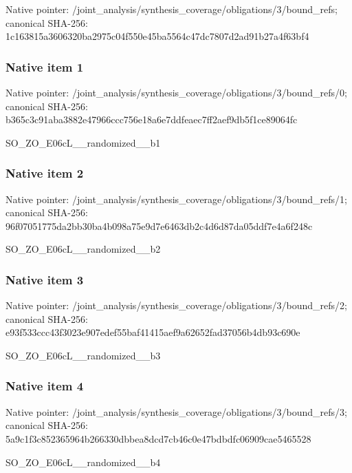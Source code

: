 \documentclass[10pt,a4paper]{article}
\begin{document}
Native pointer: /joint\_analysis/synthesi\allowbreak{}s\_coverage/obligations/3\allowbreak{}/bound\_refs; canonical SHA-256: 1c163815a3606320ba2975c0\allowbreak{}4f550e45ba5564c47dc7807d\allowbreak{}2ad91b27a4f63bf4



\subsubsection{Native item 1}


Native pointer: /joint\_analysis/synthesi\allowbreak{}s\_coverage/obligations/3\allowbreak{}/bound\_refs/0; canonical SHA-256: b365c3c91aba3882e47966cc\allowbreak{}c756e18a6e7ddfeaec7ff2ae\allowbreak{}f9db5f1ce89064fc


SO\_ZO\_E06cL\_\_randomized\_\_b1


\subsubsection{Native item 2}


Native pointer: /joint\_analysis/synthesi\allowbreak{}s\_coverage/obligations/3\allowbreak{}/bound\_refs/1; canonical SHA-256: 96f07051775da2bb30ba4b09\allowbreak{}8a75e9d7e6463db2c4d6d87d\allowbreak{}a05ddf7e4a6f248c


SO\_ZO\_E06cL\_\_randomized\_\_b2


\subsubsection{Native item 3}


Native pointer: /joint\_analysis/synthesi\allowbreak{}s\_coverage/obligations/3\allowbreak{}/bound\_refs/2; canonical SHA-256: e93f533ccc43f3023e907ede\allowbreak{}f55baf41415aef9a62652fad\allowbreak{}37056b4db93c690e


SO\_ZO\_E06cL\_\_randomized\_\_b3


\subsubsection{Native item 4}


Native pointer: /joint\_analysis/synthesi\allowbreak{}s\_coverage/obligations/3\allowbreak{}/bound\_refs/3; canonical SHA-256: 5a9c1f3c852365964b266330\allowbreak{}dbbea8dcd7cb46c0e47bdbdf\allowbreak{}c06909cae5465528


SO\_ZO\_E06cL\_\_randomized\_\_b4
\end{document}
